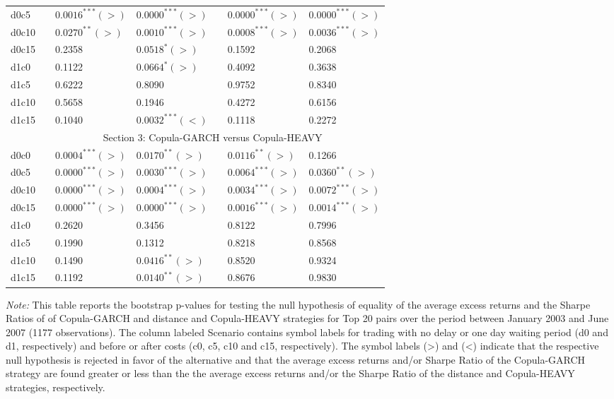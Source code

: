 \documentclass[a4paper,12pt]{report}
\begin{document}
\begin{threeparttable}[H]
\begin{tabularx}{\textwidth}{@{\extracolsep{\fill}}lllllll@{}}
		d0c5 & & $0.0016^{***}(>)$ & $0.0000^{***}(>)$ &       & $0.0000^{***}(>)$ & $0.0000^{***}(>)$   \\
		d0c10 & & $0.0270^{**}(>)$ & $0.0010^{***}(>)$ &       & $0.0008^{***}(>)$ & $0.0036^{***}(>)$ \\
		d0c15 & & 0.2358 & $0.0518^{*}(>)$ &       & 0.1592 & 0.2068 \\
		d1c0 & & 0.1122 & $0.0664^{*}(>)$  &       & 0.4092 & 0.3638 \\
		d1c5 & & 0.6222 & 0.8090 &       & 0.9752 & 0.8340 \\
		d1c10 & & 0.5658 & 0.1946 &       & 0.4272 & 0.6156 \\
		d1c15 & & 0.1040 & $0.0032^{***}(<)$ &       & 0.1118 & 0.2272 \\
		\midrule
		& \multicolumn{6}{c}{Section 3: Copula-GARCH versus Copula-HEAVY} \\
		\midrule
		d0c0 & & $0.0004^{***}(>)$ & $0.0170^{**}(>)$ &       & $0.0116^{**}(>)$ & 0.1266 \\
		d0c5 & & $0.0000^{***}(>)$ & $0.0030^{***}(>)$ &       & $0.0064^{***}(>)$ & $0.0360^{**}(>)$   \\
		d0c10 & & $0.0000^{***}(>)$ & $0.0004^{***}(>)$ &       & $0.0034^{***}(>)$ & $0.0072^{***}(>)$ \\
		d0c15 & & $0.0000^{***}(>)$ & $0.0000^{***}(>)$ &       & $0.0016^{***}(>)$ & $0.0014^{***}(>)$ \\
		d1c0 & & 0.2620  & 0.3456  &       & 0.8122  & 0.7996 \\
		d1c5 & & 0.1990 & 0.1312 &       & 0.8218 & 0.8568 \\
		d1c10 & & 0.1490 & $0.0416^{**}(>)$ &       & 0.8520 & 0.9324 \\
		d1c15 & & 0.1192 & $0.0140^{**}(>)$ &       & 0.8676 & 0.9830 \\
		\bottomrule
	\end{tabularx}%
	\begin{tablenotes}
		\item \textit{Note:} \scriptsize This table reports the bootstrap p-values for testing the null hypothesis of equality of the average excess returns and the Sharpe Ratios of of Copula-GARCH and distance and Copula-HEAVY strategies for Top 20 pairs over the period between January 2003 and June 2007 (1177 observations). The column labeled Scenario contains symbol labels for trading with no delay or one day waiting period (d0 and d1, respectively) and before or after costs (c0, c5, c10 and c15, respectively). The symbol labels (>) and (<) indicate that the respective null hypothesis is rejected in favor of the alternative and that the average excess returns and/or Sharpe Ratio of the Copula-GARCH strategy are found greater or less than the the average excess returns and/or the Sharpe Ratio of the distance and Copula-HEAVY strategies, respectively.

\end{tablenotes}
\end{threeparttable}
\end{document}
